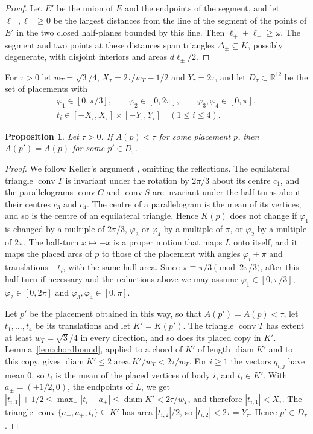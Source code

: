 \documentclass[11pt]{amsart}
\newtheorem{proposition}[theorem]{Proposition}
\theoremstyle{definition}
\theoremstyle{remark}
\numberwithin{equation}{section}
\newcommand{\R}{\mathbb{R}}
\newcommand{\area}{\operatorname{area}}
\newcommand{\conv}{\operatorname{conv}}
\begin{document}
\begin{proof}
Let $E'$ be the union of $E$ and the endpoints of the segment, and let $\ell_+,\ell_-\ge0$ be the largest distances from the line of the segment of the points of $E'$ in the two closed half-planes bounded by this line. Then $\ell_++\ell_-\ge\omega$. The segment and two points at these distances span triangles $\Delta_\pm\subseteq K$, possibly degenerate, with disjoint interiors and areas $d\ell_\pm/2$.
\end{proof}

For $\tau>0$ let $w_T=\sqrt3/4$, $X_\tau=2\tau/w_T-1/2$ and $Y_\tau=2\tau$, and let $D_\tau\subset\R^{12}$ be the set of placements with
\begin{gather*}
\varphi_1\in[0,\pi/3],\qquad\varphi_2\in[0,2\pi],\qquad\varphi_3,\varphi_4\in[0,\pi],\\
t_i\in[-X_\tau,X_\tau]\times[-Y_\tau,Y_\tau]\quad(1\le i\le4).
\end{gather*}

\begin{proposition}\label{prop:domain}
Let $\tau>0$. If $A(p)<\tau$ for some placement $p$, then $A(p')=A(p)$ for some $p'\in D_\tau$.
\end{proposition}

\begin{proof}
We follow Keller's argument \cite[Section~3.2]{Kel26}, omitting the reflections. The equilateral triangle $\conv T$ is invariant under the rotation by $2\pi/3$ about its centre $c_1$, and the parallelograms $\conv C$ and $\conv S$ are invariant under the half-turns about their centres $c_3$ and $c_4$. The centre of a parallelogram is the mean of its vertices, and so is the centre of an equilateral triangle. Hence $K(p)$ does not change if $\varphi_1$ is changed by a multiple of $2\pi/3$, $\varphi_3$ or $\varphi_4$ by a multiple of $\pi$, or $\varphi_2$ by a multiple of $2\pi$. The half-turn $x\mapsto-x$ is a proper motion that maps $L$ onto itself, and it maps the placed arcs of $p$ to those of the placement with angles $\varphi_i+\pi$ and translations $-t_i$, with the same hull area. Since $\pi\equiv\pi/3\pmod{2\pi/3}$, after this half-turn if necessary and the reductions above we may assume $\varphi_1\in[0,\pi/3]$, $\varphi_2\in[0,2\pi]$ and $\varphi_3,\varphi_4\in[0,\pi]$.

Let $p'$ be the placement obtained in this way, so that $A(p')=A(p)<\tau$, let $t_1,\dots,t_4$ be its translations and let $K'=K(p')$. The triangle $\conv T$ has extent at least $w_T=\sqrt3/4$ in every direction, and so does its placed copy in $K'$. Lemma~\ref{lem:chordbound}, applied to a chord of $K'$ of length $\operatorname{diam}K'$ and to this copy, gives $\operatorname{diam}K'\le2\area K'/w_T<2\tau/w_T$. For $i\ge1$ the vectors $q_{i,j}$ have mean $0$, so $t_i$ is the mean of the placed vertices of body $i$, and $t_i\in K'$. With $a_\pm=(\pm1/2,0)$, the endpoints of $L$, we get $|t_{i,1}|+1/2\le\max_\pm|t_i-a_\pm|\le\operatorname{diam}K'<2\tau/w_T$, and therefore $|t_{i,1}|<X_\tau$. The triangle $\conv\{a_-,a_+,t_i\}\subseteq K'$ has area $|t_{i,2}|/2$, so $|t_{i,2}|<2\tau=Y_\tau$. Hence $p'\in D_\tau$.
\end{proof}
\end{document}
